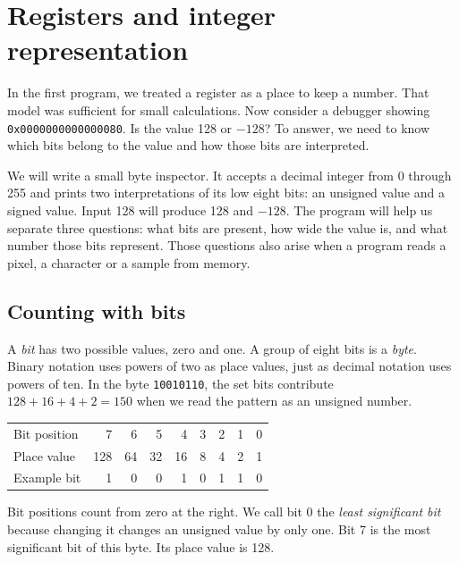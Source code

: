 \chapter{Registers and integer representation}
\label{revision:integer-representation}

In the first program, we treated a register as a place to keep a number. That
model was sufficient for small calculations. Now consider a debugger showing
\texttt{0x0000000000000080}. Is the value 128 or $-128$? To answer, we need to
know which bits belong to the value and how those bits are interpreted.

We will write a small byte inspector. It accepts a decimal integer from 0 through
255 and prints two interpretations of its low eight bits: an unsigned value and
a signed value. Input 128 will produce 128 and $-128$. The program will help us
separate three questions: what bits are present, how wide the value is, and what
number those bits represent. Those questions also arise when a program reads a
pixel, a character or a sample from memory.

\section{Counting with bits}

A \emph{bit} has two possible values, zero and one. A group of eight bits is a
\emph{byte}. Binary notation uses powers of two as place values, just as decimal
notation uses powers of ten. In the byte \texttt{10010110}, the set bits contribute
$128+16+4+2=150$ when we read the pattern as an unsigned number.

\begin{center}
  \begin{tabular}{lrrrrrrrr}
    \toprule
    Bit position & 7   & 6  & 5  & 4  & 3 & 2 & 1 & 0 \\
    Place value  & 128 & 64 & 32 & 16 & 8 & 4 & 2 & 1 \\
    Example bit  & 1   & 0  & 0  & 1  & 0 & 1 & 1 & 0 \\
    \bottomrule
  \end{tabular}
\end{center}

Bit positions count from zero at the right. We call bit 0 the \emph{least
  significant bit} because changing it changes an unsigned value by only one.
Bit 7 is the most significant bit of this byte. Its place value is 128.

